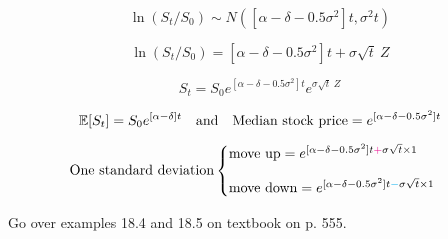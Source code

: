 \begin{frame}[fragile]
\begin{equation*}
	\ln(S_t / S_0) \sim N\left([\alpha-\delta-0.5\sigma^2]t, \sigma^2 t\right)
\end{equation*}
\bigskip

\begin{equation*}
	\ln(S_t / S_0) = [\alpha-\delta-0.5\sigma^2]t+ \sigma \sqrt{t}\: Z
\end{equation*}
\bigskip

\begin{equation*}
	S_t= S_0 e^{[\alpha-\delta-0.5\sigma^2]t} e^{\sigma \sqrt{t} \: Z}
\end{equation*}
\bigskip

\mySeparateLine
\bigskip

\begin{equation*}
	\mathbb{E}[S_t]                   = S_0 e^{[\alpha-\delta]t} \quad \text{and} \quad
	\text{Median stock price} = e^{[\alpha-\delta-0.5\sigma^2]t}
\end{equation*}

\begin{equation*}
	\text{One standard deviation}
	\begin{cases}
		\text{move up} = e^{[\alpha-\delta-0.5\sigma^2]t \textcolor{magenta}{+} \sigma \sqrt{t} \times 1}  \\[1em]
		\text{move down} = e^{[\alpha-\delta-0.5\sigma^2]t \textcolor{cyan}{-} \sigma \sqrt{t} \times 1}
	\end{cases}
\end{equation*}
\end{frame}
\begin{frame}[fragile]
	\begin{center}
		Go over examples 18.4 and 18.5 on textbook on p. 555.
	\end{center}
\end{frame}
